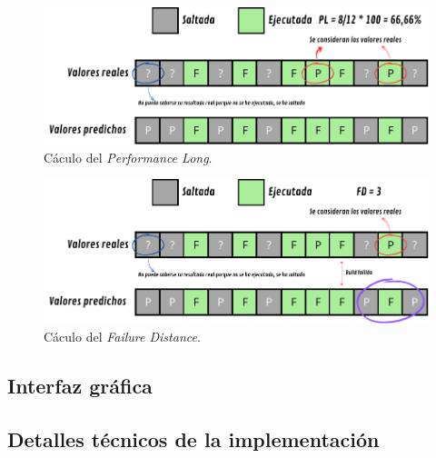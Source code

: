 \begin{figure}[H]
    \centering
    \includegraphics[scale=0.9]{images/PL.pdf}
    \caption{Cáculo del \textit{Performance Long}.}
    \label{fig:PL}
\end{figure}

\begin{figure}[H]
    \centering
    \includegraphics[scale=0.9]{images/FD.pdf}
    \caption{Cáculo del \textit{Failure Distance}.}
    \label{fig:PL}
\end{figure}

\subsection{Interfaz gráfica}


\subsection{Detalles técnicos de la implementación}

